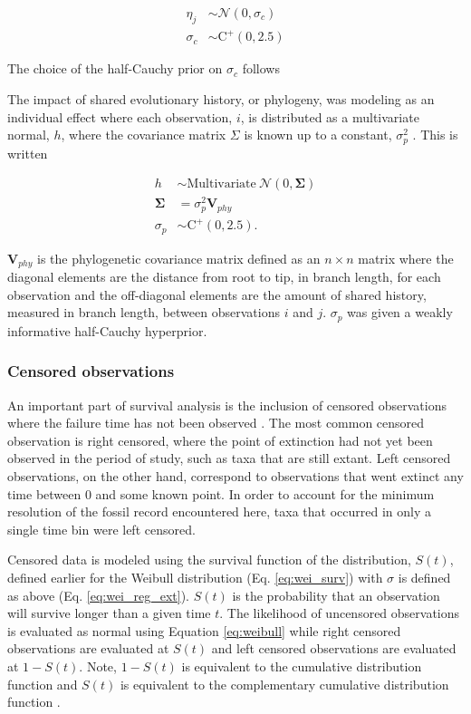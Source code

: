\documentclass{article}
\begin{document}
\begin{align*}
  \eta_{j} &\sim \mathcal{N}(0, \sigma_{c}) \\
  \sigma_{c} &\sim \mathrm{C}^{+}(0, 2.5)
\end{align*}

The choice of the half-Cauchy prior on \(\sigma_{c}\) follows \cite{Gelman2006a}

The impact of shared evolutionary history, or phylogeny, was modeling as an individual effect where each observation, \(i\), is distributed as a multivariate normal, \(h\), where the covariance matrix \(\Sigma\) is known up to a constant, \(\sigma_{p}^{2}\) \cite{Lynch1991,Housworth2004}. This is written

\begin{align*}
  h &\sim \mathrm{Multivariate\ }\mathcal{N}(0, \mathbf{\Sigma}) \\
  \mathbf{\Sigma} &= \sigma_{p}^{2} \mathbf{V}_{phy} \\
  \sigma_{p} &\sim \mathrm{C}^{+}(0, 2.5).
\end{align*}

\(\mathbf{V}_{phy}\) is the phylogenetic covariance matrix defined as an \(n \times n\) matrix where the diagonal elements are the distance from root to tip, in branch length, for each observation and the off-diagonal elements are the amount of shared history, measured in branch length, between observations \(i\) and \(j\). \(\sigma_{p}\) was given a weakly informative half-Cauchy hyperprior. 


\subsubsection{Censored observations} \label{sec:censor}

An important part of survival analysis is the inclusion of censored observations where the failure time has not been observed \cite{Ibrahim2001,Klein2003}. The most common censored observation is right censored, where the point of extinction had not yet been observed in the period of study, such as taxa that are still extant. Left censored observations, on the other hand, correspond to observations that went extinct any time between 0 and some known point. In order to account for the minimum resolution of the fossil record encountered here, taxa that occurred in only a single time bin were left censored.

Censored data is modeled using the survival function of the distribution, \(S(t)\), defined earlier for the Weibull distribution (Eq. \ref{eq:wei_surv}) with \(\sigma\) is defined as above (Eq. \ref{eq:wei_reg_ext}). \(S(t)\) is the probability that an observation will survive longer than a given time \(t\). The likelihood of uncensored observations is evaluated as normal using Equation \ref{eq:weibull} while right censored observations are evaluated at \(S(t)\) and left censored observations are evaluated at \(1 - S(t)\). Note, \(1 - S(t)\) is equivalent to the cumulative distribution function and \(S(t)\) is equivalent to the complementary cumulative distribution function \cite{Gelman2013d}.
\end{document}
